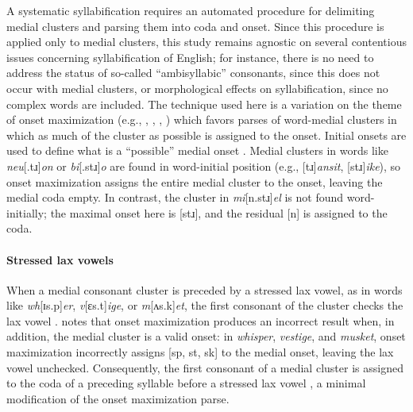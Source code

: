 A systematic syllabification requires an automated procedure for delimiting medial clusters and parsing them into coda and onset. Since this procedure is applied only to medial clusters, this study remains agnostic on several contentious issues concerning syllabification of English; for instance, there is no need to address the status of so-called ``ambisyllabic'' consonants, since this does not occur with medial clusters, or morphological effects on syllabification, since no complex words are included. The technique used here is a variation on the theme of onset maximization (e.g., \citealp[42f.]{Kahn1976}, \citealp{Kurylowicz1948}, \citealp[75]{Pulgram1970}, \citealp[][358f.]{Selkirk1982b}) which favors parses of word-medial clusters in which as much of the cluster as possible is assigned to the onset. Initial onsets are used to define what is a ``possible'' medial onset \citep[though cf.][36]{Fischer-Jorgensen1952}. Medial clusters in words like \emph{neu}[.tɹ]\emph{on} or \emph{bi}[.stɹ]\emph{o} are found in word-initial position (e.g., [tɹ]\emph{ansit}, [stɹ]\emph{ike}), so onset maximization assigns the entire medial cluster to the onset, leaving the medial coda empty. In contrast, the cluster in \emph{mi}[n.stɹ]\emph{el} is not found word-initially; the maximal onset here is [stɹ], and the residual [n] is assigned to the coda.

\paragraph{Stressed lax vowels} When a medial consonant cluster is preceded by a stressed lax vowel, as in words like \emph{wh}[ɪs.p]\emph{er}, \emph{v}[ɛs.t]\emph{ige}, or \emph{m}[ʌs.k]\emph{et}, the first consonant of the cluster checks the lax vowel \citep[e.g.,][3]{Hammond1997}. \citet[][55]{Harris1994} notes that onset maximization produces an incorrect result when, in addition, the medial cluster is a valid onset: in \emph{whisper}, \emph{vestige}, and \emph{musket}, onset maximization incorrectly assigns [sp, st, sk] to the medial onset, leaving the lax vowel unchecked. Consequently, the first consonant of a medial cluster is assigned to the coda of a preceding syllable before a stressed lax vowel \citep[cf.][48]{Pulgram1970}, a minimal modification of the onset maximization parse.

